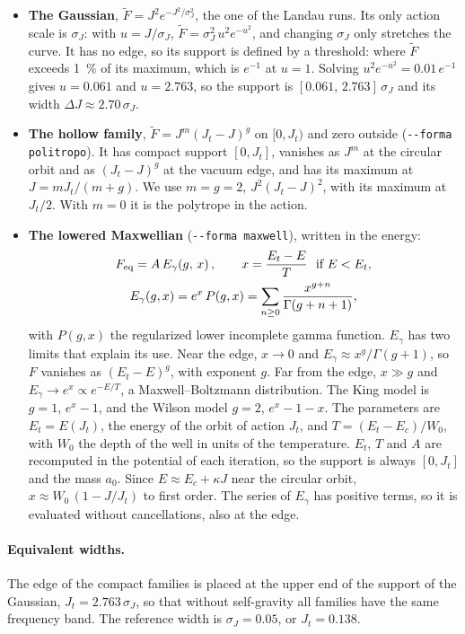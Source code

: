 \documentclass[11pt,a4paper]{article}
\begin{document}
\begin{itemize}
\item \textbf{The Gaussian}, $\tilde F=J^2e^{-J^2/\sigma_J^2}$, the one of the Landau runs.
Its only action scale is $\sigma_J$: with $u=J/\sigma_J$, $\tilde F=\sigma_J^2\,u^2e^{-u^2}$, and
changing $\sigma_J$ only stretches the curve. It has no edge, so its support is defined by
a threshold: where $\tilde F$ exceeds \SI{1}{\%} of its maximum, which is $e^{-1}$ at $u=1$.
Solving $u^2e^{-u^2}=0.01\,e^{-1}$ gives $u=0.061$ and $u=2.763$, so the support is
$[0.061,\,2.763]\,\sigma_J$ and its width $\Delta J\approx2.70\,\sigma_J$.
\item \textbf{The hollow family}, $\tilde F=J^m(J_t-J)^g$ on $[0,J_t)$ and zero outside
(\texttt{-{}-forma politropo}). It has compact support $[0,J_t]$, vanishes as $J^m$ at the
circular orbit and as $(J_t-J)^g$ at the vacuum edge, and has its maximum at
$J=mJ_t/(m+g)$. We use $m=g=2$, $J^2(J_t-J)^2$, with its maximum at $J_t/2$. With $m=0$ it is
the polytrope in the action.
\item \textbf{The lowered Maxwellian} (\texttt{-{}-forma maxwell}), written in the energy:
\begin{gather*}
  F_{\rm eq} = A\,E_\gamma\!\left(g,\,x\right),\qquad x=\frac{E_t-E}{T}\ \ \text{if }E<E_t,\\
  E_\gamma(g,x) = e^x\,P(g,x) = \sum_{n\ge0}\frac{x^{g+n}}{\Gamma(g+n+1)},
\end{gather*}
with $P(g,x)$ the regularized lower incomplete gamma function. $E_\gamma$ has two limits
that explain its use. Near the edge, $x\to0$ and $E_\gamma\approx x^g/\Gamma(g+1)$, so $F$
vanishes as $(E_t-E)^g$, with exponent $g$. Far from the edge, $x\gg g$ and
$E_\gamma\to e^x\propto e^{-E/T}$, a Maxwell--Boltzmann distribution. The King model is
$g=1$, $e^x-1$, and the Wilson model $g=2$, $e^x-1-x$. The parameters are $E_t=E(J_t)$, the
energy of the orbit of action $J_t$, and $T=(E_t-E_c)/W_0$, with $W_0$ the depth of the well
in units of the temperature. $E_t$, $T$ and $A$ are recomputed in the potential of each
iteration, so the support is always $[0,J_t]$ and the mass $a_0$. Since $E\approx E_c+\kappa J$
near the circular orbit, $x\approx W_0\,(1-J/J_t)$ to first order. The series of $E_\gamma$ has
positive terms, so it is evaluated without cancellations, also at the edge.
\end{itemize}

\paragraph{Equivalent widths.} The edge of the compact families is placed at the upper
end of the support of the Gaussian, $J_t=2.763\,\sigma_J$, so that without self-gravity all
families have the same frequency band. The reference width is $\sigma_J=0.05$, or
$J_t=0.138$.
\end{document}
